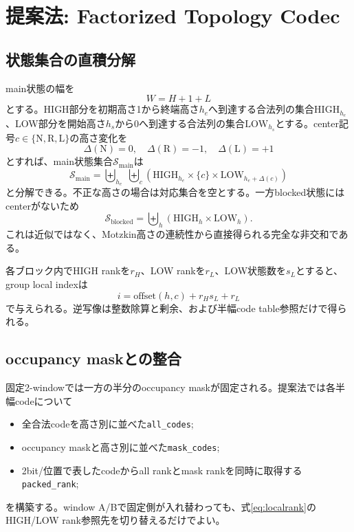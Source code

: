 \documentclass[a4paper,10pt,twocolumn]{ltjsarticle}
\newcommand{\code}[1]{\texttt{#1}}
\newcommand{\R}{\mathrm{R}}
\newcommand{\Lsym}{\mathrm{L}}
\newcommand{\Nsym}{\mathrm{N}}
\newcommand{\high}{\mathrm{HIGH}}
\newcommand{\low}{\mathrm{LOW}}
\newcommand{\main}{\mathrm{main}}
\newcommand{\block}{\mathrm{blocked}}
\begin{document}
\section{提案法: Factorized Topology Codec}
\subsection{状態集合の直積分解}
main状態の幅を
\[
W=H+1+L
\]
とする。HIGH部分を初期高さ1から終端高さ$h_e$へ到達する合法列の集合$\high_{h_e}$、LOW部分を開始高さ$h_s$から0へ到達する合法列の集合$\low_{h_s}$とする。center記号$c\in\{\Nsym,\R,\Lsym\}$の高さ変化を
\[
\Delta(\Nsym)=0,\quad \Delta(\R)=-1,\quad \Delta(\Lsym)=+1
\]
とすれば、main状態集合$\mathcal{S}_{\main}$は
\begin{equation}
\mathcal{S}_{\main}
=\biguplus_{h_e}\;\biguplus_{c}
\left(\high_{h_e}\times\{c\}\times\low_{h_e+\Delta(c)}\right)
\label{eq:factor-main}
\end{equation}
と分解できる。不正な高さの場合は対応集合を空とする。一方blocked状態にはcenterがないため
\begin{equation}
\mathcal{S}_{\block}
=\biguplus_h \left(\high_h\times\low_h\right).
\label{eq:factor-block}
\end{equation}
これは近似ではなく、Motzkin高さの連続性から直接得られる完全な非交和である。

各ブロック内でHIGH rankを$r_H$、LOW rankを$r_L$、LOW状態数を$s_L$とすると、group local indexは
\begin{equation}
 i=\mathrm{offset}(h,c)+r_H s_L+r_L
\label{eq:localrank}
\end{equation}
で与えられる。逆写像は整数除算と剰余、および半幅code table参照だけで得られる。

\subsection{occupancy maskとの整合}
固定2-windowでは一方の半分のoccupancy maskが固定される。提案法では各半幅codeについて
\begin{itemize}
  \item 全合法codeを高さ別に並べた\code{all\_codes};
  \item occupancy maskと高さ別に並べた\code{mask\_codes};
  \item 2bit/位置で表したcodeからall rankとmask rankを同時に取得する\code{packed\_rank};
\end{itemize}
を構築する。window A/Bで固定側が入れ替わっても、式\eqref{eq:localrank}のHIGH/LOW rank参照先を切り替えるだけでよい。
\end{document}
